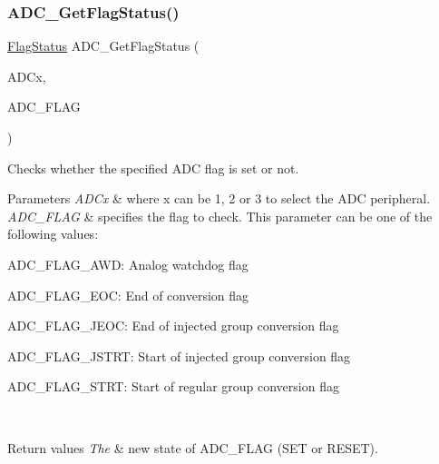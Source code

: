 \subsubsection{\texorpdfstring{ADC\_GetFlagStatus()}{ADC\_GetFlagStatus()}}
{\footnotesize\ttfamily \mbox{\hyperlink{group___exported__types_ga89136caac2e14c55151f527ac02daaff}{Flag\+Status}} A\+D\+C\+\_\+\+Get\+Flag\+Status (\begin{DoxyParamCaption}\item[{\mbox{\hyperlink{struct_a_d_c___type_def}{A\+D\+C\+\_\+\+Type\+Def}} $\ast$}]{A\+D\+Cx,  }\item[{uint8\+\_\+t}]{A\+D\+C\+\_\+\+F\+L\+AG }\end{DoxyParamCaption})}



Checks whether the specified A\+DC flag is set or not. 


\begin{DoxyParams}{Parameters}
{\em A\+D\+Cx} & where x can be 1, 2 or 3 to select the A\+DC peripheral. \\
\hline
{\em A\+D\+C\+\_\+\+F\+L\+AG} & specifies the flag to check. This parameter can be one of the following values\+: \begin{DoxyItemize}
\item A\+D\+C\+\_\+\+F\+L\+A\+G\+\_\+\+A\+WD\+: Analog watchdog flag \item A\+D\+C\+\_\+\+F\+L\+A\+G\+\_\+\+E\+OC\+: End of conversion flag \item A\+D\+C\+\_\+\+F\+L\+A\+G\+\_\+\+J\+E\+OC\+: End of injected group conversion flag \item A\+D\+C\+\_\+\+F\+L\+A\+G\+\_\+\+J\+S\+T\+RT\+: Start of injected group conversion flag \item A\+D\+C\+\_\+\+F\+L\+A\+G\+\_\+\+S\+T\+RT\+: Start of regular group conversion flag \end{DoxyItemize}
\\
\hline
\end{DoxyParams}

\begin{DoxyRetVals}{Return values}
{\em The} & new state of A\+D\+C\+\_\+\+F\+L\+AG (S\+ET or R\+E\+S\+ET). \\
\hline
\end{DoxyRetVals}
\mbox{\label{group___a_d_c___exported___functions_ga1dea5ed24571a2e0ce4cbd41c9c1ec46}} 
